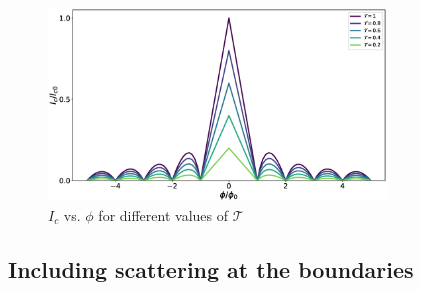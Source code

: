 \begin{figure}
\centering
\includegraphics[width=0.8\textwidth]{figure/analyticalmodel/ic_vs_tau}
\caption{$I_c$ vs. $\phi$ for different values of  $\mathcal{T}$}
\end{figure}

\subsection*{Including scattering at the boundaries}


